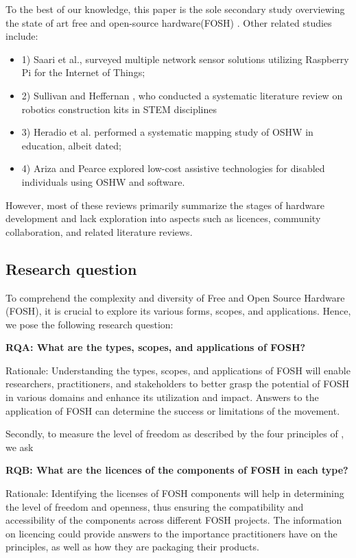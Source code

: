 \documentclass[final-report.tex]{subfiles}
\begin{document}
To the best of our knowledge, this paper is the sole secondary study overviewing the state of art free and open-source hardware(FOSH) . Other related studies include: 
\begin{itemize}
    \renewcommand{\labelitemi}{}
    \item 1) Saari et al.\cite{7973568}, surveyed multiple network sensor solutions utilizing Raspberry Pi for the Internet of Things; 
    \item 2) Sullivan and Heffernan \cite{sullivan2016robotic}, who conducted a systematic literature review on robotics construction kits in STEM disciplines
    \item 3) Heradio et al. \cite{heradio2018open} performed a systematic mapping study of OSHW in education, albeit dated; 
    \item 4) Ariza and Pearce explored low-cost assistive technologies for disabled individuals using OSHW and software.
\end{itemize}
 However, most of these reviews primarily summarize the stages of hardware development and lack exploration into aspects such as licences, community collaboration, and related literature reviews.
 
\subsection{Research question}

To comprehend the complexity and diversity of Free and Open Source Hardware (FOSH), it is crucial to explore its various forms, scopes, and applications. Hence, we pose the following research question:

    \textbf{RQA: What are the types, scopes, and applications of FOSH?}
    
Rationale: Understanding the types, scopes, and applications of FOSH will enable researchers, practitioners, and stakeholders to better grasp the potential of FOSH in various domains and enhance its utilization and impact.
Answers to the application of FOSH can determine the success or limitations of the movement.

    \label{RQA}
    
Secondly, to measure the level of freedom as described by the four principles of \cite{b0_stallman}, we ask

    \textbf{RQB: What are the licences of the components of FOSH in each type?}
    
Rationale: Identifying the licenses of FOSH components will help in determining the level of freedom and openness, thus ensuring the compatibility and accessibility of the components across different FOSH projects.
The information on licencing could provide answers to the importance practitioners have on the principles, as well as how they are packaging their products. 
\end{document}
